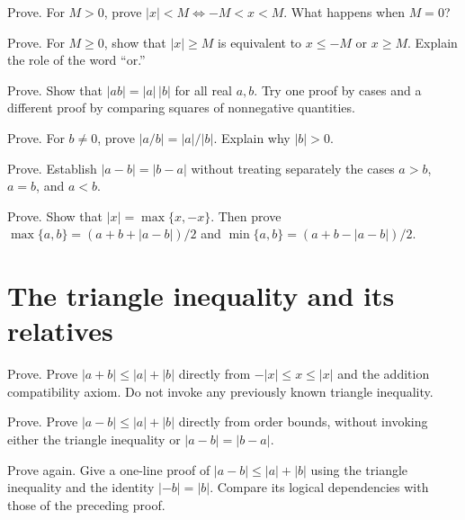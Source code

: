 \documentclass{workbook}
\begin{document}
\begin{problem}{Prove.}
For $M>0$, prove $|x|<M\iff -M<x<M$.
What happens when $M=0$?
\end{problem}

\begin{problem}{Prove.}
For $M\geq0$, show that $|x|\geq M$ is equivalent to
$x\leq -M$ or $x\geq M$. Explain the role of the word ``or.''
\end{problem}

\begin{problem}{Prove.}
Show that $|ab|=|a|\,|b|$ for all real $a,b$.
Try one proof by cases and a different proof by comparing squares of
nonnegative quantities.
\end{problem}

\begin{problem}{Prove.}
For $b\neq0$, prove $|a/b|=|a|/|b|$.
Explain why $|b|>0$.
\end{problem}

\begin{problem}{Prove.}
Establish $|a-b|=|b-a|$ without treating separately the cases $a>b$,
$a=b$, and $a<b$.
\end{problem}

\begin{problem}{Prove.}
Show that $|x|=\max\{x,-x\}$.
Then prove
$\max\{a,b\}=(a+b+|a-b|)/2$ and
$\min\{a,b\}=(a+b-|a-b|)/2$.
\end{problem}

\section{The triangle inequality and its relatives}

\begin{problem}{Prove.}
Prove $|a+b|\leq|a|+|b|$ directly from
$-|x|\leq x\leq|x|$ and the addition compatibility axiom.
Do not invoke any previously known triangle inequality.
\end{problem}

\begin{problem}{Prove.}
Prove $|a-b|\leq|a|+|b|$ directly from order bounds, without invoking
either the triangle inequality or $|a-b|=|b-a|$.
\end{problem}

\begin{problem}{Prove again.}
Give a one-line proof of $|a-b|\leq|a|+|b|$ using the triangle inequality
and the identity $|-b|=|b|$. Compare its logical dependencies with those
of the preceding proof.
\end{problem}
\end{document}
